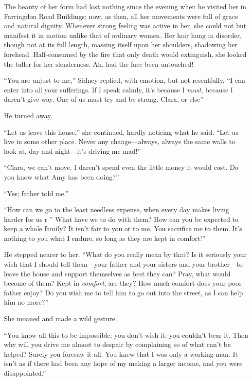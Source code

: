 The beauty of her form had lost nothing since the evening when he
visited her in Farringdon Road Buildings; now, as then, all her
movements were full of grace and natural dignity. Whenever strong
feeling was active in her, she could not but manifest it in motion
unlike that of ordinary women. Her hair hung in disorder, though not at
its full length, massing itself upon her shoulders, shadowing her
forehead. Half-consumed by the fire that only death would extinguish,
she looked the taller for her slenderness. Ah, had the face been
untouched!

``You are unjust to me,'' Sidney replied, with emotion, but not
resentfully. ``I can enter into all your sufferings. If I speak calmly,
it's because I \emph{must}, because I daren't give way. One of us must
try and be strong, Clara, or else''

He turned away.

``Let us leave this house,'' she continued, hardly noticing what he
said. ``Let us live in some other place. Never any {}change---always,
always the same walls to look at, day and night---it's driving me mad!''

``Clara, we can't move. I daren't spend even the little money it would
cost. Do you know what Amy has been doing?''

``Yes; father told me.''

``How can we go to the least needless expense, when every day makes
living harder for us r '' What have we to do with them? How can you be
expected to keep a whole family? It isn't fair to you or to me. You
sacrifice me to them. It's nothing to you what I endure, so long as they
are kept in comfort!''

He stepped nearer to her. ``What do you really mean by that? Is it
seriously your wish that I should tell them---your father and your
sisters and your brother---to leave the house and support themselves as
best they can? Pray, what would become of them? Kept in \emph{comfort},
are they? How much comfort does your poor father enjoy? Do you wish me
to tell him to go out into the street, as I can help him no more?''

She moaned and made a wild gesture.

``You know all this to be impossible; you {}don't wish it; you couldn't
bear it. Then why will you drive me almost to despair by complaining so
of what can't be helped? Surely you foresaw it all. You knew that I was
only a working man. It isn't as if there had been any hope of my making
a larger income, and you were disappointed.''


